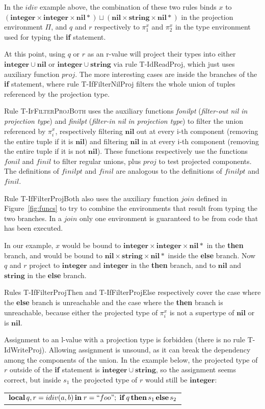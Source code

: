 \documentclass[10pt]{sigplanconf}
\newcommand{\Nil}{\mathbf{nil}}
\newcommand{\Integer}{\mathbf{integer}}
\newcommand{\String}{\mathbf{string}}
\begin{document}
In the $idiv$ example above, the combination of these two rules binds $x$ to
$(\Integer \times \Integer \times \Nil{*}) \sqcup (\Nil \times \String \times \Nil{*})$ in the projection environment $\Pi$,
and $q$ and $r$ respectively to $\pi_{1}^{x}$ and $\pi_{2}^{x}$
in the type environment used for typing the {\bf if} statement.

At this point, using $q$ or $r$ as an r-value will project
their types into either $\Integer \cup \Nil$ or $\Integer \cup \String$ via rule {\sc T-IdReadProj}, which just uses auxiliary function $proj$. The more interesting cases are inside the
branches of the {\bf if} statement, where rule {\sc T-IfFilterNilProj} filters the whole union of tuples referenced
by the projection type.

Rule \textsc{T-IfFilterProjBoth} uses the auxiliary functions \emph{fonilpt} ({\em filter-out nil in projection type}) and \emph{finilpt} ({\em filter-in nil in projection type}) to
filter the union referenced by $\pi_{i}^{x}$, respectively
filtering $\Nil$ out at every i-th component (removing
the entire tuple if it is $\Nil$) and filtering $\Nil$ in at every i-th component (removing the entire tuple if it is not $\Nil$). These functions respectively use the functions $fonil$ and $finil$ to filter regular unions, plus $proj$ to test projected components. The definitions of $finilpt$ and $finil$ are analogous to the definitions of $finilpt$ and $finil$.

Rule {\sc T-IfFilterProjBoth} also uses the auxiliary function $join$ defined in Figure~\ref{fig:funcs} to try to combine the environments that result from typing the two branches. In a $join$ only one environment is guaranteed to be from code that has been executed.

In our example, $x$ would be bound to $\Integer \times \Integer \times \Nil{*}$ in the {\bf then} branch, and would be bound
to $\Nil \times \String \times \Nil{*}$ inside the {\bf else}
branch. Now $q$ and $r$ project to $\Integer$ and $\Integer$
in the {\bf then} branch, and to $\Nil$ and $\String$ in the
{\bf else} branch. 

Rules {\sc T-IfFilterProjThen} and {\sc T-IfFilterProjElse}
respectively cover the case where the {\bf else} branch is unreachable and the case where the {\bf then} branch is unreachable, because either the projected type of $\pi_i^x$
is not a supertype of $\Nil$ or is $\Nil$.

Assignment to an l-value with a projection type is forbidden
(there is no rule {\sc T-IdWriteProj}). Allowing assignment is unsound, as it can break the dependency among the components of the union. In the example below,
the projected type of $r$ outside of the {\bf if} statement
is $\Integer \cup \String$, so the assignment seems correct,
but inside $s_1$ the projected type of $r$ would still be
$\Integer$:
{\footnotesize
\begin{center}
	\begin{tabular}{ll}
		\multicolumn{2}{l}{$\mathbf{local} \, q, r = idiv(a, b) \, \mathbf{in}\; r = ``foo" ;\; \mathbf{if} \, q \, \mathbf{then} \, s_1 \, \mathbf{else} \, s_2$}
	\end{tabular}
\end{center}
}
\end{document}
